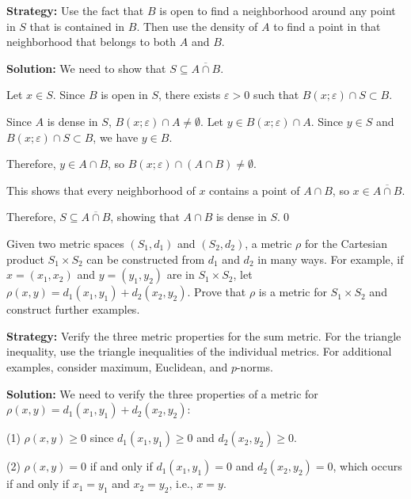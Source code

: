 \noindent\textbf{Strategy:} Use the fact that $B$ is open to find a neighborhood around any point in $S$ that is contained in $B$. Then use the density of $A$ to find a point in that neighborhood that belongs to both $A$ and $B$.

\bigskip\noindent\textbf{Solution:} We need to show that $S \subseteq \overline{A \cap B}$.

Let $x \in S$. Since $B$ is open in $S$, there exists $\varepsilon > 0$ such that $B(x;\varepsilon) \cap S \subset B$.

Since $A$ is dense in $S$, $B(x;\varepsilon) \cap A \neq \emptyset$. Let $y \in B(x;\varepsilon) \cap A$. Since $y \in S$ and $B(x;\varepsilon) \cap S \subset B$, we have $y \in B$.

Therefore, $y \in A \cap B$, so $B(x;\varepsilon) \cap (A \cap B) \neq \emptyset$.

This shows that every neighborhood of $x$ contains a point of $A \cap B$, so $x \in \overline{A \cap B}$.

Therefore, $S \subseteq \overline{A \cap B}$, showing that $A \cap B$ is dense in $S$.\qed


\begin{problembox}
\begin{problemstatement}
Given two metric spaces \((S_1, d_1)\) and \((S_2, d_2)\), a metric \( \rho \) for the Cartesian product \( S_1 \times S_2 \) can be constructed from \( d_1 \) and \( d_2 \) in many ways. For example, if \( x = (x_1, x_2) \) and \( y = (y_1, y_2) \) are in \( S_1 \times S_2 \), let \( \rho(x, y) = d_1(x_1, y_1) + d_2(x_2, y_2) \). Prove that \( \rho \) is a metric for \( S_1 \times S_2 \) and construct further examples.
\end{problemstatement}
\end{problembox}

\noindent\textbf{Strategy:} Verify the three metric properties for the sum metric. For the triangle inequality, use the triangle inequalities of the individual metrics. For additional examples, consider maximum, Euclidean, and $p$-norms.

\bigskip\noindent\textbf{Solution:} We need to verify the three properties of a metric for $\rho(x,y) = d_1(x_1,y_1) + d_2(x_2,y_2)$:

(1) $\rho(x,y) \geq 0$ since $d_1(x_1,y_1) \geq 0$ and $d_2(x_2,y_2) \geq 0$.

(2) $\rho(x,y) = 0$ if and only if $d_1(x_1,y_1) = 0$ and $d_2(x_2,y_2) = 0$, which occurs if and only if $x_1 = y_1$ and $x_2 = y_2$, i.e., $x = y$.

